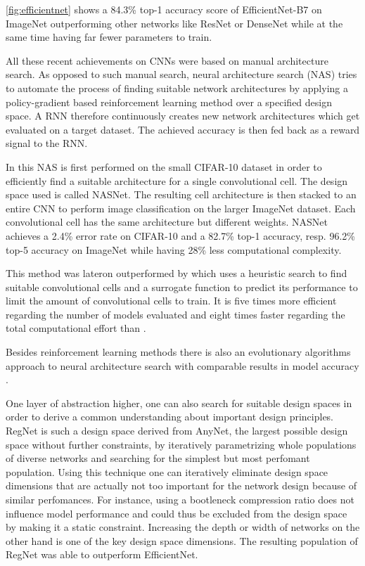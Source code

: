 \autoref{fig:efficientnet} shows a 84.3\% top-1 accuracy score of EfficientNet-B7 on ImageNet outperforming other networks like ResNet or DenseNet while at the same time having far fewer parameters to train. \cite{LeMingxingTan.2019}

All these recent achievements on CNNs were based on manual architecture search. As opposed to such manual search, neural architecture search (NAS) tries to automate the process of finding suitable network architectures by applying a policy-gradient based reinforcement learning method over a specified design space. A RNN therefore continuously creates new network architectures which get evaluated on a target dataset. The achieved accuracy is then fed back as a reward signal to the RNN. \cite{LeBarretZoph.2017}

In \cite{BarretZoph.2018} this NAS is first performed on the small CIFAR-10 dataset in order to efficiently find a suitable architecture for a single convolutional cell. The design space used is called NASNet. The resulting cell architecture is then stacked to an entire CNN to perform image classification on the larger ImageNet dataset. Each convolutional cell has the same architecture but different weights. NASNet achieves a 2.4\% error rate on CIFAR-10 and a 82.7\% top-1 accuracy, resp. 96.2\% top-5 accuracy on ImageNet while having 28\% less computational complexity. 

This method was lateron outperformed by \cite{ChenxiLiu.2018} which uses a heuristic search to find suitable convolutional cells and a surrogate function to predict its performance to limit the amount of convolutional cells to train. It is five times more efficient regarding the number of models evaluated and eight times faster regarding the total computational effort than \cite{BarretZoph.2018}. 

Besides reinforcement learning methods there is also an evolutionary algorithms approach to neural architecture search with comparable results in model accuracy \cite{EstebanReal.2019}.

One layer of abstraction higher, one can also search for suitable design spaces in order to derive a common understanding about important design principles. RegNet is such a design space derived from AnyNet, the largest possible design space without further constraints, by iteratively parametrizing whole populations of diverse networks and searching for the simplest but most perfomant population. Using this technique one can iteratively eliminate design space dimensions that are actually not too important for the network design because of similar perfomances. For instance, using a bootleneck compression ratio does not influence model performance and could thus be excluded from the design space by making it a static constraint. Increasing the depth or width of networks on the other hand is one of the key design space dimensions. The resulting population of RegNet was able to outperform EfficientNet. \cite{IlijaRadosavovic.2020}

